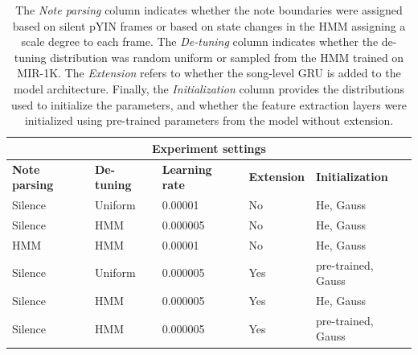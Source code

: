\begin{table}
\centering
\begin{tabularx}{\columnwidth}{ |X|X|X|X|X| } 
\hline
\multicolumn{5}{|c|}{\textbf{Experiment settings}}\\
\hline\hline
\textbf{Note parsing} & \textbf{De-tuning} & \textbf{Learning rate} & \textbf{Extension} & \textbf{Initialization} \\
\hline\hline
Silence & Uniform & 0.00001 & No & He, Gauss \\
\hline
Silence & HMM & 0.000005 & No & He, Gauss\\ 
\hline
HMM & HMM & 0.00001 & No & He, Gauss\\ 
\hline
Silence & Uniform & 0.000005 & Yes & pre-trained, Gauss\\
\hline
Silence & HMM & 0.000005 & Yes & He, Gauss\\ 
\hline
Silence & HMM & 0.000005 & Yes & pre-trained, Gauss\\ 
\hline
\end{tabularx}
\label{table:experiments}
\caption{The \textit{Note parsing} column indicates whether the note boundaries were assigned based on silent pYIN frames or based on state changes in the HMM assigning a scale degree to each frame. The \textit{De-tuning} column indicates whether the de-tuning distribution was random uniform or sampled from the HMM trained on MIR-1K. The \textit{Extension} refers to whether the song-level GRU is added to the model architecture. Finally, the \textit{Initialization} column provides the distributions used to initialize the parameters, and whether the feature extraction layers were initialized using pre-trained parameters from the model without extension.}
\end{table}

